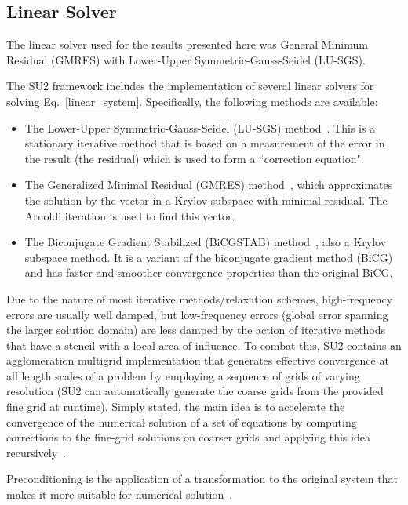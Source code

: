 
\subsection*{Linear Solver}
The linear solver used for the results presented here was General Minimum Residual (GMRES) with Lower-Upper Symmetric-Gauss-Seidel (LU-SGS). 




The SU2 framework includes the implementation of several linear solvers for solving Eq.~\ref{linear_system}. Specifically, the following methods are available:
\begin{itemize}
\item The Lower-Upper Symmetric-Gauss-Seidel (LU-SGS) method~\cite{yoon88, jameson81b, jameson87}. This is a stationary iterative method that is based on a measurement of the error in the result (the residual) which is used to form a ``correction equation".
\item The Generalized Minimal Residual (GMRES) method~\cite{saad1986}, which approximates the solution by the vector in a Krylov subspace with minimal residual. The Arnoldi iteration is used to find this vector.
\item The Biconjugate Gradient Stabilized  (BiCGSTAB) method~\cite{Vorst1992}, also a Krylov subspace method. It is a variant of the biconjugate gradient method (BiCG) and has faster and smoother convergence properties than the original BiCG.
\end{itemize}


Due to the nature of most iterative methods/relaxation schemes, high-frequency errors are usually well damped, but low-frequency errors (global error spanning the larger solution domain) are less damped by the action of iterative methods that have a stencil with a local area of influence. To combat this, SU2 contains an agglomeration multigrid implementation that generates effective convergence at all length scales of a problem by employing a sequence of grids of varying resolution (SU2 can automatically generate the coarse grids from the provided fine grid at runtime). Simply stated, the main idea is to accelerate the convergence of the numerical solution of a set of equations by computing corrections to the fine-grid solutions on coarser grids and applying this idea recursively~\cite{jameson86, mavriplis1998, mavriplis1995, borzi-2003, palacios-2011}. 

Preconditioning is the application of a transformation to the original system that makes it more suitable for numerical solution~\cite{pierce-1997}.